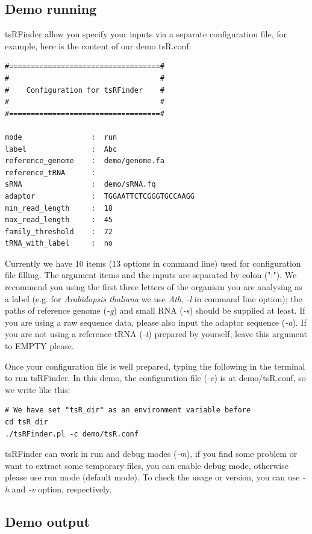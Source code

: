 \documentclass[11pt, a4paper]{article}
\begin{document}
\subsection{Demo running}

tsRFinder allow you specify your inputs via a separate configuration file, for example, here is the content of our demo tsR.conf:

\begin{verbatim}
#===================================#
#                                   #
#    Configuration for tsRFinder    #
#                                   #
#===================================#

mode                :  run
label               :  Abc
reference_genome    :  demo/genome.fa 
reference_tRNA      :
sRNA                :  demo/sRNA.fq
adaptor             :  TGGAATTCTCGGGTGCCAAGG
min_read_length     :  18
max_read_length     :  45
family_threshold    :  72
tRNA_with_label     :  no
\end{verbatim}

Currently we have 10 items (13 options in command line) used for configuration file filling. The argument items and the inputs are separated by colon (":"). We recommend you using the first three letters of the organism you are analysing as a label (e.g. for \textit{Arabidopsis thaliana} we use \textit{Ath}, \emph{-l} in command line option); the paths of reference genome (\emph{-g}) and small RNA (\emph{-s}) should be supplied at least. If you are using a raw sequence data, please also input the adaptor sequence (\emph{-a}). If you are not using a reference tRNA (\emph{-t}) prepared by yourself, leave this argument to EMPTY please.

Once your configuration file is well prepared, typing the following in the terminal to run tsRFinder. In this demo, the configuration file (\emph{-c}) is at demo/tsR.conf, so we write like this:

\begin{verbatim}
# We have set "tsR_dir" as an environment variable before
cd tsR_dir
./tsRFinder.pl -c demo/tsR.conf
\end{verbatim}

tsRFinder can work in run and debug modes (\emph{-m}), if you find some problem or want to extract some temporary files, you can enable debug mode, otherwise please use run mode (default mode). To check the usage or version, you can use \emph{-h} and \emph{-v} option, respectively.

\subsection{Demo output}
\end{document}
